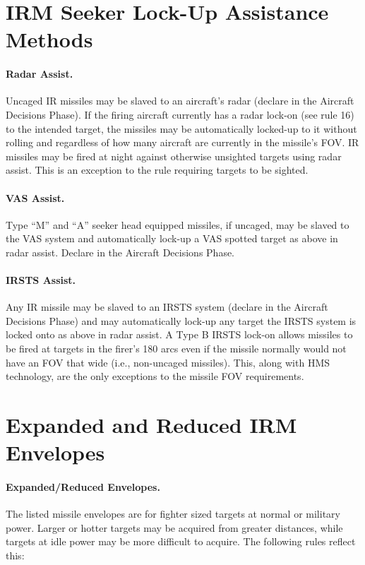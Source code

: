 \begin{advancedrules}
\section{IRM Seeker Lock-Up Assistance Methods}
\label{rule:irm-seeker-lock-up-assistance-methods}
\label{rule:irm-radar}
\label{rule:irm-vas}
\label{rule:irm-irsts}

\paragraph{Radar Assist.} Uncaged IR missiles may be slaved to an aircraft's radar (declare in the Aircraft Decisions Phase). If the firing aircraft currently has a radar lock-on (see rule 16) to the intended target, the missiles may be automatically locked-up to it without rolling and regardless of how many aircraft are currently in the missile's FOV. IR missiles may be fired at night against otherwise unsighted targets using radar assist. This is an exception to the rule requiring targets to be sighted.

\paragraph{VAS Assist.} Type “M” and “A” seeker head equipped missiles, if uncaged, may be slaved to the VAS system and automatically lock-up a VAS spotted target as above in radar assist. Declare in the Aircraft Decisions Phase.

\paragraph{IRSTS Assist.} Any IR missile may be slaved to an IRSTS system (declare in the Aircraft Decisions Phase) and may automatically lock-up any target the IRSTS system is locked onto as above in radar assist. A Type B IRSTS lock-on allows missiles to be fired at targets in the firer's 180 arcs even if the missile normally would not have an FOV that wide (i.e., non-uncaged missiles). This, along with HMS technology, are the only exceptions to the missile FOV requirements.

\section{Expanded and Reduced IRM Envelopes}

\paragraph{Expanded/Reduced Envelopes.} The listed missile envelopes are for fighter sized targets at normal or military power. Larger or hotter targets may be acquired from greater distances, while targets at idle power may be more difficult to acquire. The following rules reflect this:


\end{advancedrules}
